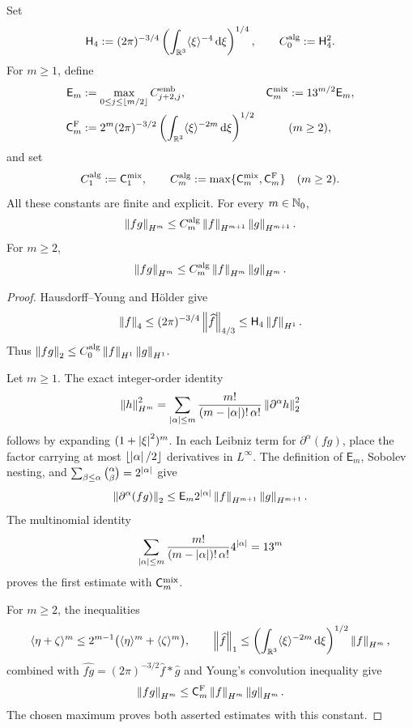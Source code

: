 \begin{lemma}
\label{lem:sobolev-product}
Set
\[
 \mathsf H_4:=(2\pi)^{-3/4}
 \left(\int_{\mathbb R^3}\langle\xi\rangle^{-4}\,\mathrm d\xi\right)^{1/4},
 \qquad C_0^{\rm alg}:=\mathsf H_4^2.
\]
For \(m\ge1\), define
\begin{align*}
 \mathsf E_m
 &:=\max_{0\le j\le\lfloor m/2\rfloor}C_{j+2,j}^{\rm emb},
 &\mathsf C_m^{\rm mix}&:=13^{m/2}\mathsf E_m,\\
 \mathsf C_m^{\rm F}
 &:=2^m(2\pi)^{-3/2}
 \left(\int_{\mathbb R^3}\langle\xi\rangle^{-2m}\,\mathrm d\xi\right)^{1/2}
 &&(m\ge2),
\end{align*}
and set
\[
 C_1^{\rm alg}:=\mathsf C_1^{\rm mix},
 \qquad
 C_m^{\rm alg}:=\max\{\mathsf C_m^{\rm mix},\mathsf C_m^{\rm F}\}
 \quad(m\ge2).
\]
All these constants are finite and explicit.  For every \(m\in\mathbb N_0\),
\[
 \left\lVert fg\right\rVert_{H^m}
 \le C_m^{\rm alg}\left\lVert f\right\rVert_{H^{m+1}}\left\lVert g\right\rVert_{H^{m+1}}.
\]
For \(m\ge2\),
\[
 \left\lVert fg\right\rVert_{H^m}
 \le C_m^{\rm alg}\left\lVert f\right\rVert_{H^m}\left\lVert g\right\rVert_{H^m}.
\]
\end{lemma}

\begin{proof}
Hausdorff--Young and H\"older give
\[
 \left\lVert f\right\rVert_4
 \le(2\pi)^{-3/4}\left\lVert \widehat f\right\rVert_{4/3}
 \le\mathsf H_4\left\lVert f\right\rVert_{H^1}.
\]
Thus \(\left\lVert fg\right\rVert_2\le C_0^{\rm alg}\left\lVert f\right\rVert_{H^1}\left\lVert g\right\rVert_{H^1}\).

Let \(m\ge1\).  The exact integer-order identity
\[
 \left\lVert h\right\rVert_{H^m}^2
 =\sum_{\left|\alpha\right|\le m}
 \frac{m!}{(m-\left|\alpha\right|)!\,\alpha!}
 \left\lVert \partial^\alpha h\right\rVert_2^2
\]
follows by expanding \((1+\left|\xi\right|^2)^m\).  In each Leibniz term for
\(\partial^\alpha(fg)\), place the factor carrying at most
\(\lfloor\left|\alpha\right|/2\rfloor\) derivatives in \(L^\infty\).  The definition
of \(\mathsf E_m\), Sobolev nesting, and
\(\sum_{\beta\le\alpha}\binom\alpha\beta=2^{\left|\alpha\right|}\) give
\[
 \left\lVert \partial^\alpha(fg)\right\rVert_2
 \le \mathsf E_m2^{\left|\alpha\right|}
 \left\lVert f\right\rVert_{H^{m+1}}\left\lVert g\right\rVert_{H^{m+1}}.
\]
The multinomial identity
\[
 \sum_{\left|\alpha\right|\le m}
 \frac{m!}{(m-\left|\alpha\right|)!\,\alpha!}4^{\left|\alpha\right|}=13^m
\]
proves the first estimate with \(\mathsf C_m^{\rm mix}\).

For \(m\ge2\), the inequalities
\[
 \langle\eta+\zeta\rangle^m
 \le2^{m-1}\bigl(\langle\eta\rangle^m+
                         \langle\zeta\rangle^m\bigr),
 \qquad
 \left\lVert \widehat f\right\rVert_1
 \le\left(\int_{\mathbb R^3}\langle\xi\rangle^{-2m}\,\mathrm d\xi\right)^{1/2}
       \left\lVert f\right\rVert_{H^m},
\]
combined with \(\widehat{fg}=(2\pi)^{-3/2}\widehat f*\widehat g\)
and Young's convolution inequality give
\[
 \left\lVert fg\right\rVert_{H^m}
 \le\mathsf C_m^{\rm F}\left\lVert f\right\rVert_{H^m}\left\lVert g\right\rVert_{H^m}.
\]
The chosen maximum proves both asserted estimates with this constant.
\end{proof}

